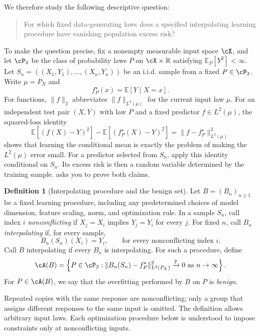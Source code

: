 \documentclass[11pt,twoside]{article}
\newcommand{\E}{\mathbb E}
\renewcommand{\P}{\mathbb P}
\newcommand{\R}{\mathbb R}
\theoremstyle{definition}
\newtheorem{definition}[theorem]{Definition}
\theoremstyle{remark}
\begin{document}
We therefore study the following descriptive question:

\begin{quote}
For which fixed data-generating laws does a specified interpolating learning
procedure have vanishing population excess risk?
\end{quote}

To make the question precise, fix a nonempty measurable input space $\cX$, and let
$\cP_2$ be the class of probability laws $P$ on $\cX\times\R$ satisfying
$\E_P[Y^2]<\infty$. Let
$S_n=((X_1,Y_1),\ldots,(X_n,Y_n))$ be an i.i.d. sample from a fixed
$P\in\cP_2$. Write $\mu=P_X$ and
\[
 f_P^\star(x)=\E[Y\mid X=x].
\]
For functions, $\|f\|_2$ abbreviates $\|f\|_{L^2(\mu)}$ for the current
input law $\mu$.
For an independent test pair $(X,Y)$ with law $P$ and a fixed predictor
$f\in L^2(\mu)$, the squared-loss identity
\begin{equation}
 \E[(f(X)-Y)^2]-\E[(f_P^\star(X)-Y)^2]
 =\|f-f_P^\star\|_{L^2(\mu)}^2
 \label{eq:excess-l2}
\end{equation}
shows that learning the conditional mean is exactly the problem of making the
$L^2(\mu)$ error small. For a predictor selected from $S_n$, apply this identity
conditional on $S_n$. Its excess risk is then a random variable determined by
the training sample.  asks you to prove both
claims.

\begin{definition}[Interpolating procedure and the benign set]
\label{def:benign-set}
Let $B=(B_n)_{n\ge1}$ be a fixed learning procedure, including any
predetermined choices of model dimension, feature scaling, norm, and
optimization rule. In a sample $S_n$, call index $i$ \emph{nonconflicting} if
$X_j=X_i$ implies $Y_j=Y_i$ for every $j$. For fixed $n$, call $B_n$
\emph{interpolating} if, for every sample,
\[
 B_n(S_n)(X_i)=Y_i,
 \qquad\text{for every nonconflicting index }i.
\]
Call $B$ interpolating if every $B_n$ is interpolating. For such a procedure,
define
\begin{equation}
 \cA(B)=\left\{P\in\cP_2:
 \|B_n(S_n)-f_P^\star\|_{L^2(P_X)}^2\xrightarrow{\P}0 \text{ as }n\to \infty
 \right\}.
 \label{eq:benign-set}
\end{equation}
For $P\in\cA(B)$, we say that the overfitting performed by $B$ on $P$ is
\emph{benign}.
\end{definition}

Repeated copies with the same response are nonconflicting; only a group that
assigns different responses to the same input is omitted. The definition
allows arbitrary input laws. Each optimization procedure below is understood
to impose constraints only at nonconflicting inputs.
\end{document}
